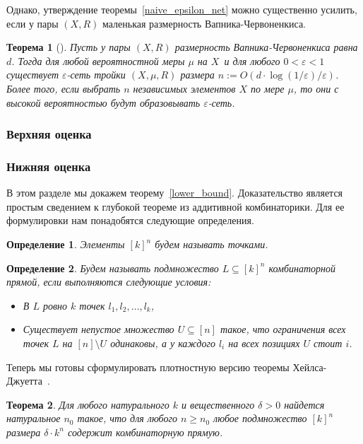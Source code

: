 \documentclass[12pt]{article}
\newcommand{\eps}{\varepsilon}
\newtheorem{definition}{Определение}
\newtheorem{theorem}{Теорема}
\begin{document}
    Однако, утверждение теоремы~\ref{naive_epsilon_net} можно существенно усилить, если у пары $(X, R)$
    маленькая размерность Вапника-Червоненкиса.

    \begin{theorem}[\cite{HW86}]
        \label{full_epsilon_net}
        Пусть у пары $(X, R)$ размерность Вапника-Червоненкиса равна $d$. Тогда для любой вероятностной меры $\mu$ на $X$\
        и для любого $0 < \varepsilon < 1$ существует $\varepsilon$-сеть тройки $(X, \mu, R)$ размера
        $n := O(d \cdot \log(1 / \varepsilon) / \varepsilon)$.
        Более того, если выбрать $n$ независимых элементов $X$ по мере $\mu$, то они с высокой вероятностью будут
        образовывать $\eps$-сеть.
    \end{theorem}
    \subsubsection{Верхняя оценка}
    \label{subsubsection_upper_bound}
    \subsubsection{Нижняя оценка}
    \label{subsubsection_lower_bound}
    В этом разделе мы докажем теорему~\ref{lower_bound}.
    Доказательство является простым сведением к глубокой теореме из аддитивной комбинаторики. Для ее формулировки нам
    понадобятся следующие определения.

    \begin{definition}
        Элементы $[k]^n$ будем называть \emph{точками}.
    \end{definition}

    \begin{definition}
        Будем называть подмножество $L \subseteq [k]^n$ \emph{комбинаторной прямой},
        если выполняются следующие условия:
        \begin{itemize}
            \item В $L$ ровно $k$ точек $l_1, l_2, \ldots, l_k$,
            \item Существует непустое множество $U \subseteq [n]$ такое, что ограничения всех точек 
            $L$ на $[n] \setminus U$ одинаковы, а у каждого $l_i$ на всех позициях $U$ стоит $i$.
        \end{itemize}
    \end{definition}

    Теперь мы готовы сформулировать плотностную версию теоремы Хейлса-Джуетта~\cite{P09}.
    \begin{theorem}
        \label{density_hales_jewett}
        Для любого натурального $k$ и вещественного $\delta > 0$ найдется натуральное $n_0$ такое, что для
        любого $n \geq n_0$ любое подмножество $[k]^n$ размера $\delta \cdot k^n$ содержит комбинаторную
        прямую.
    \end{theorem}
\end{document}
